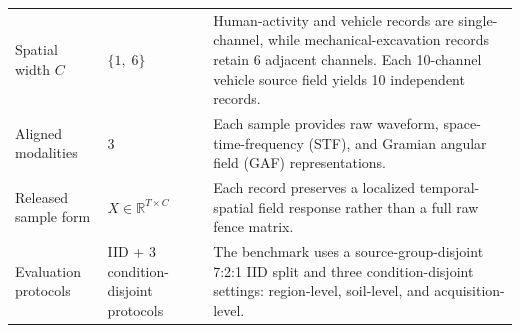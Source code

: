 \begin{table}[t]
\begin{tabular}{p{3.2cm}p{4.0cm}p{6.1cm}}
Spatial width $C$ & $\{1,\;6\}$ & Human-activity and vehicle records are single-channel, while mechanical-excavation records retain 6 adjacent channels. Each 10-channel vehicle source field yields 10 independent records. \\

Aligned modalities & 3 & Each sample provides raw waveform, space-time-frequency (STF), and Gramian angular field (GAF) representations. \\

Released sample form & $X \in \mathbb{R}^{T \times C}$ & Each record preserves a localized temporal-spatial field response rather than a full raw fence matrix. \\

Evaluation protocols & IID + 3 condition-disjoint protocols & The benchmark uses a source-group-disjoint 7:2:1 IID split and three condition-disjoint settings: region-level, soil-level, and acquisition-level. \\
\bottomrule
\end{tabular}
\end{table}
